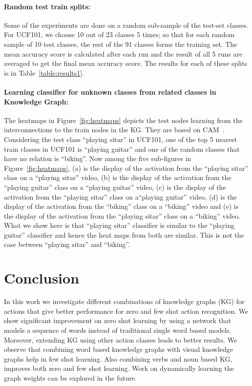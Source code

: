 \paragraph{\bf Random test train splits:}
Some of the experiments are done on a random sub-sample of the test-set classes. For UCF101, we choose 10 out of 23 classes 5 times; so that for each random sample of 10 test classes, the rest of the 91 classes forms the training set. The mean accuracy score is calculated after each run and the result of all 5 runs are averaged to get the final mean accuracy score. The results for each of these splits is in Table~\ref{table:results1}.

\paragraph{\bf Learning classifier for unknown classes from related
classes in Knowledge Graph:}
The heatmaps in Figure~\ref{fig:heatmaps} depicts the test nodes learning from the interconnections to the train nodes in the KG. They are based on CAM~\cite{zhou2016learning}.
Considering the test class ``playing sitar” in UCF101, one of the top 5 nearest train classes in UCF101 is “playing guitar” and one of the random classes that have no relation is “biking”. Now among the five sub-figures in Figure~\ref{fig:heatmaps},
(a) is the display of the activation from the ``playing sitar” class on a ``playing sitar” video, (b) is the display of the activation from the ``playing guitar” class on a ``playing guitar” video, (c) is the display of the activation from the ``playing sitar” class on a“playing guitar” video, (d) is the display of the activation from the ``biking” class on a ``biking” video and (e) is the display of the activation from the ``playing sitar” class on a ``biking” video. What we show here is that
``playing sitar” classifier is similar to the ``playing guitar” classifier and hence the
heat maps from both are similar. This is not the case between ``playing sitar”
and ``biking”.





 
\section{Conclusion}

In this work we investigate different combinations of knowledge graphs (KG) for actions that give better performance for zero and few shot action recognition. We show significant improvement on zero shot learning by using a network that models a sequence of words instead of traditional single word based models. Moreover, extending KG using other action classes leads to better results. We observe that combining word based knowledge graphs with visual knowledge graphs help in few shot learning. Also combining verbs and noun based KG, improves both zero and few shot learning. 
Work on dynamically learning the graph weights can be explored in the future.









